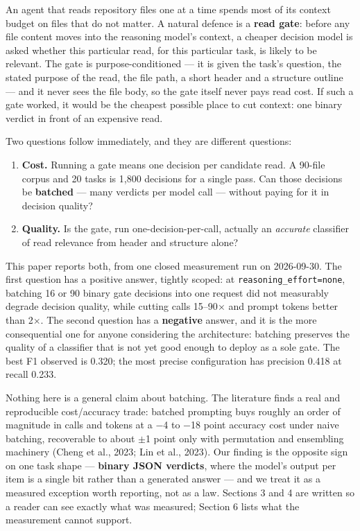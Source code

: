 \documentclass[10pt]{article}
\begin{document}
An agent that reads repository files one at a time spends most of its context budget on files that do not matter. A natural defence is a \textbf{read gate}: before any file content moves into the reasoning model's context, a cheaper decision model is asked whether this particular read, for this particular task, is likely to be relevant. The gate is purpose-conditioned --- it is given the task's question, the stated purpose of the read, the file path, a short header and a structure outline --- and it never sees the file body, so the gate itself never pays read cost. If such a gate worked, it would be the cheapest possible place to cut context: one binary verdict in front of an expensive read.

Two questions follow immediately, and they are different questions:

\begin{enumerate}
\item \textbf{Cost.} Running a gate means one decision per candidate read. A 90-file corpus and 20 tasks is 1,800 decisions for a single pass. Can those decisions be \textbf{batched} --- many verdicts per model call --- without paying for it in decision quality?
\item \textbf{Quality.} Is the gate, run one-decision-per-call, actually an \emph{accurate} classifier of read relevance from header and structure alone?
\end{enumerate}

This paper reports both, from one closed measurement run on 2026-09-30. The first question has a positive answer, tightly scoped: at \texttt{reasoning\_effort=none}, batching 16 or 90 binary gate decisions into one request did not measurably degrade decision quality, while cutting calls 15--90$\times$ and prompt tokens better than 2$\times$. The second question has a \textbf{negative} answer, and it is the more consequential one for anyone considering the architecture: batching preserves the quality of a classifier that is not yet good enough to deploy as a sole gate. The best F1 observed is 0.320; the most precise configuration has precision 0.418 at recall 0.233.

Nothing here is a general claim about batching. The literature finds a real and reproducible cost/accuracy trade: batched prompting buys roughly an order of magnitude in calls and tokens at a $-$4 to $-$18 point accuracy cost under naive batching, recoverable to about $\pm$1 point only with permutation and ensembling machinery (Cheng et al., 2023; Lin et al., 2023)\cite{ref3,ref6}. Our finding is the opposite sign on one task shape --- \textbf{binary JSON verdicts}, where the model's output per item is a single bit rather than a generated answer --- and we treat it as a measured exception worth reporting, not as a law. Sections 3 and 4 are written so a reader can see exactly what was measured; Section 6 lists what the measurement cannot support.
\end{document}
